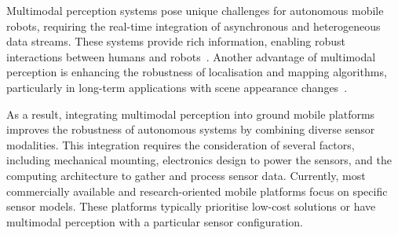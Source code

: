 \documentclass[letterpaper,10pt,conference]{IEEEtran} %
\def\figref#1{Fig.~\ref{#1}}
\begin{document}

Multimodal perception systems pose unique challenges for
autonomous mobile robots, requiring the real-time integration of
asynchronous and heterogeneous data streams.
These systems provide rich information, enabling robust interactions
between humans and robots~\cite{duncan2024jhri}.
Another advantage of multimodal perception is enhancing the
robustness of localisation and mapping algorithms,
particularly in long-term applications with
scene appearance changes~\cite{sousa2023jfr}.

As a result, integrating multimodal perception into ground mobile platforms
improves the robustness of autonomous systems by
combining diverse sensor modalities.
This integration requires the consideration of several factors,
including mechanical mounting, electronics design to power the sensors,
and the computing architecture to gather and process sensor data.
Currently, most commercially available and research-oriented mobile platforms
focus on specific sensor models. These platforms typically prioritise
low-cost solutions or have multimodal perception with a
particular sensor configuration.
\end{document}
